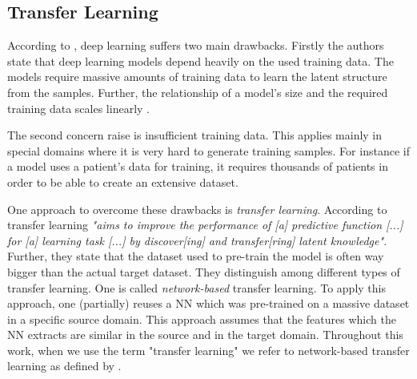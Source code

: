 \subsection{Transfer Learning}
\label{chp:fundamentals:sec:machine_learning:subsec:transfer_learning}
According to \textcite{Tan:2018}, deep learning suffers two main drawbacks.
Firstly the authors state that deep learning models depend heavily on the used training data.
The models require massive amounts of training data to learn the latent structure from the samples.
Further, the relationship of a model's size and the required training data scales linearly \parencite{Tan:2018}.

The second concern \textcite{Tan:2018} raise is insufficient training data.
This applies mainly in special domains where it is very hard to generate training samples.
For instance if a model uses a patient's data for training, it requires thousands of patients in order to be able to create an extensive dataset.

One approach to overcome these drawbacks is \textit{transfer learning}.
According to \textcite{Tan:2018} transfer learning \textit{"aims to improve the performance of [a] predictive function [...] for [a] learning task [...] by discover[ing] and transfer[ring] latent knowledge"}.
Further, they state that the dataset used to pre-train the model is often way bigger than the actual target dataset.
They distinguish among different types of transfer learning.
One is called \textit{network-based} transfer learning.
To apply this approach, one (partially) reuses a \ac{NN} which was pre-trained on a massive dataset in a specific source domain.
This approach assumes that the features which the \ac{NN} extracts are similar in the source and in the target domain.
Throughout this work, when we use the term "transfer learning" we refer to network-based transfer learning as defined by \textcite{Tan:2018}.
